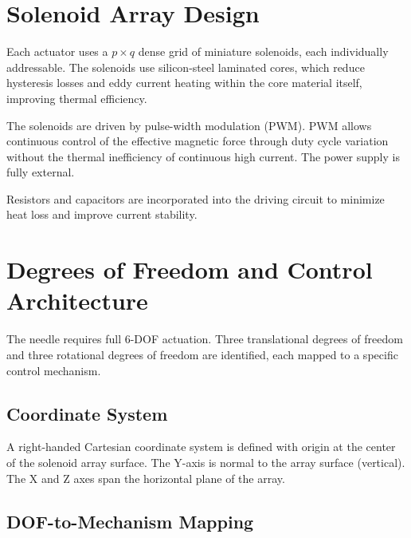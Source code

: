 \documentclass[12pt, a4paper]{article}
\begin{document}
\section{Solenoid Array Design}

Each actuator uses a $p \times q$ dense grid of miniature solenoids, each
individually addressable. The solenoids use silicon-steel laminated cores,
which reduce hysteresis losses and eddy current heating within the core
material itself, improving thermal efficiency.

The solenoids are driven by pulse-width modulation (PWM). PWM allows
continuous control of the effective magnetic force through duty cycle
variation without the thermal inefficiency of continuous high current.
The power supply is fully external.

Resistors and capacitors are incorporated into the driving circuit to
minimize heat loss and improve current stability.

\section{Degrees of Freedom and Control Architecture}

The needle requires full 6-DOF actuation. Three translational degrees of
freedom and three rotational degrees of freedom are identified, each
mapped to a specific control mechanism.

\subsection{Coordinate System}
A right-handed Cartesian coordinate system is defined with origin at the
center of the solenoid array surface. The Y-axis is normal to the array
surface (vertical). The X and Z axes span the horizontal plane of the array.

\subsection{DOF-to-Mechanism Mapping}
\end{document}
